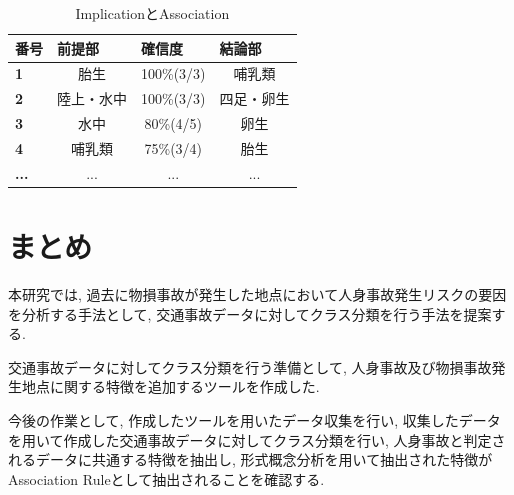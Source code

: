 \documentclass[a4j,8.5pt, twocolumn,fleqn]{jbook}
\begin{document}
\begin{table}[htb]
\caption{ImplicationとAssociation}
\label{implications}
\centering
\small
\begin{tabular}{|l|c|c|c|}
\hline
\textbf{番号}  & \multicolumn{1}{l|}{\textbf{前提部}} & \multicolumn{1}{l|}{\textbf{確信度}} & \multicolumn{1}{l|}{\textbf{結論部}} \\ \hline
\textbf{1}   & 胎生                                & 100\%(3/3)                        & 哺乳類                               \\ \hline
\textbf{2}   & 陸上・水中                             & 100\%(3/3)                        & 四足・卵生                             \\ \hline
\textbf{3}   & 水中                                & 80\%(4/5)                         & 卵生                                \\ \hline
\textbf{4}   & 哺乳類                               & 75\%(3/4)                         & 胎生                                \\ \hline
\textbf{...} & ...                               & ...                               & ...                               \\ \hline
\end{tabular}
\end{table}


\section{まとめ}
本研究では, 過去に物損事故が発生した地点において人身事故発生リスクの要因を分析する手法として, 交通事故データに対してクラス分類を行う手法を提案する. 

交通事故データに対してクラス分類を行う準備として, 人身事故及び物損事故発生地点に関する特徴を追加するツールを作成した. 

今後の作業として, 作成したツールを用いたデータ収集を行い, 収集したデータを用いて作成した交通事故データに対してクラス分類を行い, 人身事故と判定されるデータに共通する特徴を抽出し, 形式概念分析を用いて抽出された特徴がAssociation Ruleとして抽出されることを確認する. 
\end{document}
